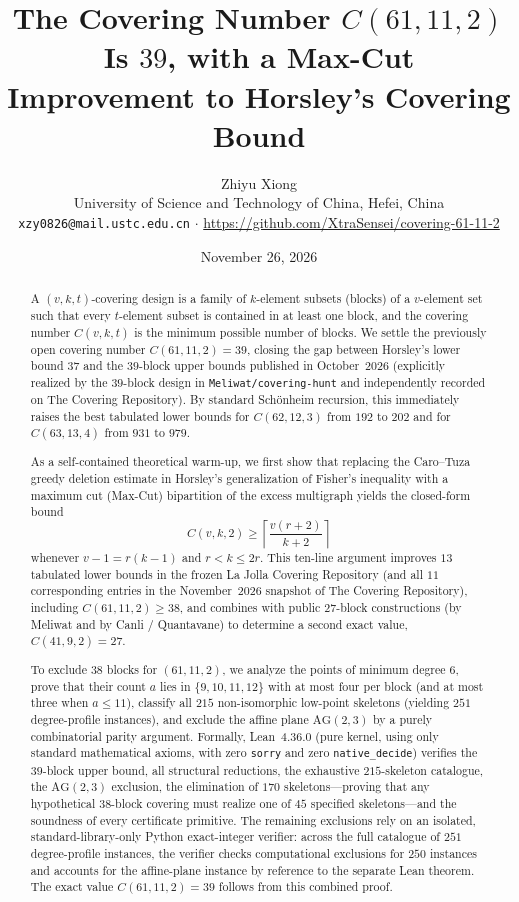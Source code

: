 \documentclass[11pt,a4paper]{article}
\title{\textbf{The Covering Number $C(61,11,2)$ Is $39$, with a Max-Cut Improvement to Horsley's Covering Bound}}
\author{
  Zhiyu Xiong\\
  \small University of Science and Technology of China, Hefei, China\\
  \small \texttt{xzy0826@mail.ustc.edu.cn} \quad $\cdot$ \quad \url{https://github.com/XtraSensei/covering-61-11-2}
}
\date{November 26, 2026}
\theoremstyle{definition}
\theoremstyle{remark}
\newcommand{\AG}{\mathrm{AG}}
\begin{document}
\maketitle

\begin{abstract}
A $(v,k,t)$-covering design is a family of $k$-element subsets (blocks) of a $v$-element set such that every $t$-element subset is contained in at least one block, and the covering number $C(v,k,t)$ is the minimum possible number of blocks. We settle the previously open covering number $C(61,11,2) = 39$, closing the gap between Horsley's lower bound $37$ and the $39$-block upper bounds published in October~2026 (explicitly realized by the $39$-block design in \texttt{Meliwat/covering-hunt} and independently recorded on The Covering Repository). By standard Sch\"onheim recursion, this immediately raises the best tabulated lower bounds for $C(62,12,3)$ from $192$ to $202$ and for $C(63,13,4)$ from $931$ to $979$.

As a self-contained theoretical warm-up, we first show that replacing the Caro--Tuza greedy deletion estimate in Horsley's generalization of Fisher's inequality with a maximum cut (Max-Cut) bipartition of the excess multigraph yields the closed-form bound
\[
  C(v,k,2) \ge \left\lceil \frac{v(r+2)}{k+2} \right\rceil
\]
whenever $v-1 = r(k-1)$ and $r < k \le 2r$. This ten-line argument improves $13$ tabulated lower bounds in the frozen La Jolla Covering Repository (and all $11$ corresponding entries in the November~2026 snapshot of The Covering Repository), including $C(61,11,2) \ge 38$, and combines with public $27$-block constructions (by Meliwat and by Canli / Quantavane) to determine a second exact value, $C(41,9,2) = 27$.

To exclude $38$ blocks for $(61,11,2)$, we analyze the points of minimum degree $6$, prove that their count $a$ lies in $\{9,10,11,12\}$ with at most four per block (and at most three when $a \le 11$), classify all $215$ non-isomorphic low-point skeletons (yielding $251$ degree-profile instances), and exclude the affine plane $\AG(2,3)$ by a purely combinatorial parity argument. Formally, Lean~4.36.0 (pure kernel, using only standard mathematical axioms, with zero \texttt{sorry} and zero \texttt{native\_decide}) verifies the $39$-block upper bound, all structural reductions, the exhaustive $215$-skeleton catalogue, the $\AG(2,3)$ exclusion, the elimination of $170$ skeletons—proving that any hypothetical $38$-block covering must realize one of $45$ specified skeletons—and the soundness of every certificate primitive. The remaining exclusions rely on an isolated, standard-library-only Python exact-integer verifier: across the full catalogue of $251$ degree-profile instances, the verifier checks computational exclusions for $250$ instances and accounts for the affine-plane instance by reference to the separate Lean theorem. The exact value $C(61,11,2)=39$ follows from this combined proof.
\end{abstract}
\end{document}

